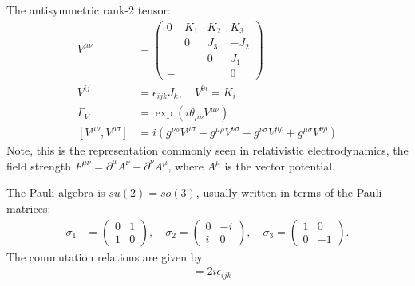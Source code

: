 \begin{example}
    The antisymmetric rank-2 tensor:
    \begin{align*}
        V^{\mu \nu} &= \begin{pmatrix}
            0 & K_1 & K_2 & K_3 \\ 
              & 0 & J_3 & -J_2 \\
              &   & 0 & J_1 \\
            -  &   &   & 0
        \end{pmatrix} \\
        V^{i j} &= \epsilon_{ijk} J_k, \quad
        V^{0 i} = K_i \\
        \Gamma_V &= \exp (i \theta_{\mu \nu} V^{\mu \nu}) \\
        [V^{\mu \nu}, V^{\rho \sigma}] &= i \left( g^{\nu \rho} V^{\mu \sigma} - g^{\mu \rho} V^{\nu \sigma} - g^{\nu \sigma} V^{\mu \rho} + g^{\mu \sigma} V^{\nu \rho} \right)
    \end{align*}
    Note, this is the representation commonly seen in relativistic electrodynamics, the field strength $F^{\mu \nu} = \partial^\mu A^\nu - \partial^\nu A^\mu$, where $A^\mu$ is the vector potential.
\end{example}

\begin{example}
    The Pauli algebra is $su(2) = so(3)$, usually written in terms of the Pauli matrices:
    \begin{align*}
        \sigma_1 &= \begin{pmatrix}
            0 & 1 \\
            1 & 0
        \end{pmatrix}, \quad
        \sigma_2 = \begin{pmatrix}
            0 & -i \\ 
            i & 0
        \end{pmatrix}, \quad
        \sigma_3 = \begin{pmatrix}
            1 & 0 \\
            0 & -1
        \end{pmatrix}.
    \end{align*}
    The commutation relations are given by
    \begin{align*}
        [\sigma_i, \sigma_j] &= 2 i \epsilon_{ijk}
    \end{align*}
\end{example}

